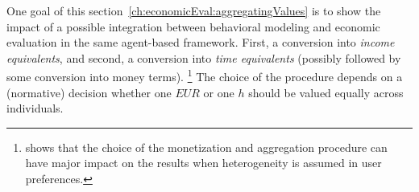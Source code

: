 One goal of this section~\ref{ch:economicEval:aggregatingValues} is to show the impact of a possible integration between behavioral modeling and economic evaluation in the same agent-based framework. 
%
%
%
%
First, a conversion into \emph{income equivalents}, and second, a conversion into \emph{time equivalents} (possibly followed by some conversion into money terms).%
%
\footnote{
%
\citet{Kickhoefer_PhDThesis_2014} shows that the choice of the monetization and aggregation procedure can have major impact on the results when heterogeneity is assumed in user preferences.
%
}
%
The choice of the procedure depends on a (normative) decision whether one $\mathit{EUR}$ or one $h$ should be valued equally across individuals.
